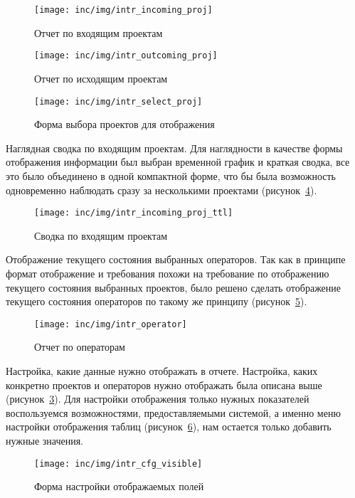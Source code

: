 \begin{figure}[!ht]
    \centering
    \texttt{[image: inc/img/intr\_incoming\_proj]}
    \caption{Отчет по входящим проектам}
    \label{pic:intr:proj:incoming}
\end{figure}

\begin{figure}[!ht]
    \centering
    \texttt{[image: inc/img/intr\_outcoming\_proj]}
    \caption{Отчет по исходящим проектам}
    \label{pic:intr:proj:outcoming}
\end{figure}

\begin{figure}[!ht]
    \centering
    \texttt{[image: inc/img/intr\_select\_proj]}
    \caption{Форма выбора проектов для отображения}
    \label{pic:intr:proj:select}
\end{figure}

Наглядная сводка по входящим проектам.
Для наглядности в качестве формы отображения информации был выбран временной
график и краткая сводка,
все это было объединено в одной компактной форме,
что бы была возможность одновременно наблюдать сразу за несколькими проектами
(рисунок~\ref{pic:intr:proj:incoming:total}).

\begin{figure}[!ht]
    \centering
    \texttt{[image: inc/img/intr\_incoming\_proj\_ttl]}
    \caption{Сводка по входящим проектам}
    \label{pic:intr:proj:incoming:total}
\end{figure}

Отображение текущего состояния выбранных операторов.
Так как в принципе формат отображение и требования похожи
на требование по отображению текущего состояния выбранных проектов,
было решено сделать отображение текущего состояния операторов по такому
же принципу (рисунок~\ref{pic:intr:operator}).

\begin{figure}[!ht]
    \centering
    \texttt{[image: inc/img/intr\_operator]}
    \caption{Отчет по операторам}
    \label{pic:intr:operator}
\end{figure}

Настройка, какие данные нужно отображать в отчете.
Настройка, каких конкретно проектов и операторов нужно отображать
была описана выше (рисунок~\ref{pic:intr:proj:select}).
Для настройки отображения только нужных показателей воспользуемся возможностями,
предоставляемыми системой,
а именно меню настройки отображения таблиц (рисунок~\ref{pic:intr:cfg:visible}),
нам остается только добавить нужные значения.

\begin{figure}[!ht]
    \centering
    \texttt{[image: inc/img/intr\_cfg\_visible]}
    \caption{Форма настройки отображаемых полей}
    \label{pic:intr:cfg:visible}
\end{figure}